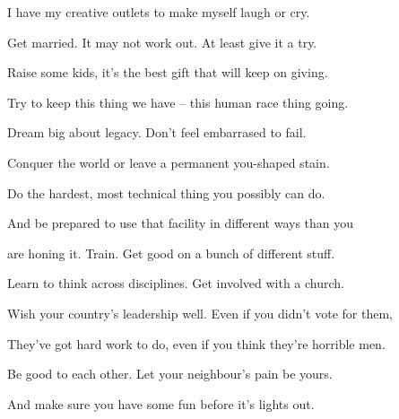 I have my creative outlets to make myself laugh or cry.

Get married. It may not work out. At least give it a try.  

Raise some kids, it's the best gift that will keep on giving.

Try to keep this thing we have -- this human race thing going. 

Dream big about legacy. Don't feel embarrased to fail.

Conquer the world or leave a permanent you-shaped stain. 

Do the hardest, most technical thing you possibly can do. 

And be prepared to use that facility in different ways than you

are honing it. Train. Get good on a bunch of different stuff. 

Learn to think across disciplines. Get involved with a church.

Wish your country's leadership well. Even if you didn't vote for them,

They've got hard work to do, even if you think they're horrible men.

Be good to each other. Let your neighbour's pain be yours.

And make sure you have some fun before it's lights out.
